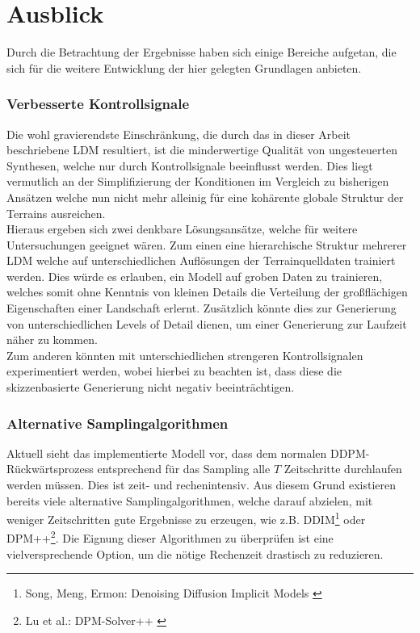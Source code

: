 \section{Ausblick}

Durch die Betrachtung der Ergebnisse haben sich einige Bereiche aufgetan, die sich für die weitere Entwicklung der hier gelegten Grundlagen anbieten.  

\subsubsection{Verbesserte Kontrollsignale}

Die wohl gravierendste Einschränkung, die durch das in dieser Arbeit beschriebene \ac{LDM} resultiert, ist die minderwertige Qualität von ungesteuerten Synthesen, welche nur durch Kontrollsignale beeinflusst werden. Dies liegt vermutlich an der Simplifizierung der Konditionen im Vergleich zu bisherigen Ansätzen welche nun nicht mehr alleinig für eine kohärente globale Struktur der Terrains ausreichen. \\
Hieraus ergeben sich zwei denkbare Lösungsansätze, welche für weitere Untersuchungen geeignet wären. Zum einen eine hierarchische Struktur mehrerer \ac{LDM} welche auf unterschiedlichen Auflösungen der Terrainquelldaten trainiert werden. Dies würde es erlauben, ein Modell auf groben Daten zu trainieren, welches somit ohne Kenntnis von kleinen Details die Verteilung der großflächigen Eigenschaften einer Landschaft erlernt. Zusätzlich könnte dies zur Generierung von unterschiedlichen Levels of Detail dienen, um einer Generierung zur Laufzeit näher zu kommen.\\
Zum anderen könnten mit unterschiedlichen strengeren Kontrollsignalen experimentiert werden, wobei hierbei zu beachten ist, dass diese die skizzenbasierte Generierung nicht negativ beeinträchtigen.  

\subsubsection{Alternative Samplingalgorithmen}

Aktuell sieht das implementierte Modell vor, dass dem normalen DDPM-Rückwärtsprozess entsprechend für das Sampling alle $T$ Zeitschritte durchlaufen werden müssen. Dies ist zeit- und rechenintensiv. Aus diesem Grund existieren bereits viele alternative Samplingalgorithmen, welche darauf abzielen, mit weniger Zeitschritten gute Ergebnisse zu erzeugen, wie z.B. DDIM\footnote{
    Song, Meng, Ermon: Denoising Diffusion Implicit Models
    \cite{song2020denoising}
} oder DPM++\footnote{
    Lu et al.: DPM-Solver++
    \cite{lu2023dpmsolverfastsolverguided}
}. Die Eignung dieser Algorithmen zu überprüfen ist eine vielversprechende Option, um die nötige Rechenzeit drastisch zu reduzieren.

